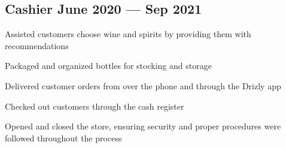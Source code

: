 \subsection{{Cashier \hfill June 2020 --- Sep 2021}}
\begin{zitemize}
\item Assisted customers choose wine and spirits by providing them with recommendations
\item Packaged and organized bottles for stocking and storage
\item Delivered customer orders from over the phone and through the Drizly app
\item Checked out customers through the cash register
\item Opened and closed the store, ensuring security and proper procedures were followed throughout the process
\end{zitemize}
